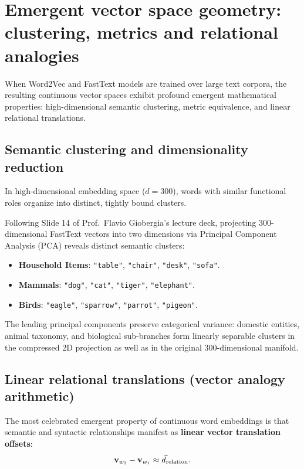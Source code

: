 \documentclass[../../main.tex]{subfiles}
\begin{document}
\section{Emergent vector space geometry: clustering, metrics and relational analogies}
\label{sec:vector_geometry_metrics}

When Word2Vec and FastText models are trained over large text corpora, the resulting continuous vector spaces exhibit profound emergent mathematical properties: high-dimensional semantic clustering, metric equivalence, and linear relational translations.

\subsection{Semantic clustering and dimensionality reduction}
\label{subsec:semantic_clustering_pca}

In high-dimensional embedding space ($d = 300$), words with similar functional roles organize into distinct, tightly bound clusters.

Following Slide 14 of Prof.~Flavio Giobergia's lecture deck, projecting 300-dimensional FastText vectors into two dimensions via Principal Component Analysis (PCA) reveals distinct semantic clusters:
\begin{itemize}
    \item \textbf{Household Items}: \texttt{"table"}, \texttt{"chair"}, \texttt{"desk"}, \texttt{"sofa"}.
    \item \textbf{Mammals}: \texttt{"dog"}, \texttt{"cat"}, \texttt{"tiger"}, \texttt{"elephant"}.
    \item \textbf{Birds}: \texttt{"eagle"}, \texttt{"sparrow"}, \texttt{"parrot"}, \texttt{"pigeon"}.
\end{itemize}
The leading principal components preserve categorical variance: domestic entities, animal taxonomy, and biological sub-branches form linearly separable clusters in the compressed 2D projection as well as in the original 300-dimensional manifold.

\subsection{Linear relational translations (vector analogy arithmetic)}
\label{subsec:relational_analogies}

The most celebrated emergent property of continuous word embeddings is that semantic and syntactic relationships manifest as \textbf{linear vector translation offsets}:
\begin{equation}
\label{eq:relational_offset_concept}
\mathbf{v}_{w_2} - \mathbf{v}_{w_1} \approx \vec{d}_{\text{relation}}.
\end{equation}
\end{document}
